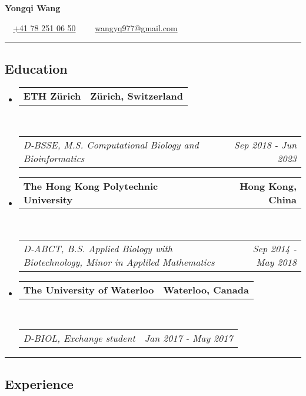 \documentclass[10pt,letterpaper]{article}
\makeatletter
\newcommand{\headerrow}[2]
{\begin{tabular*}{\linewidth}{l@{\extracolsep{\fill}}r}
	#1 &
	#2 \\
\end{tabular*}}
\makeatother
\begin{document}

\begin{center}
{\LARGE \textbf{Yongqi Wang}}

\textbullet \ \ \href{tel:410782510650}{+41 78 251 06 50} \ \
\textbullet \ \ \href{mailto:wangyq977@gmail.com}{wangyq977@gmail.com}
\end{center}



\hrule
\vspace{-1em}
\subsection*{Education}

\begin{itemize}
	\parskip=0.1em

	\item
	\headerrow
		{\textbf{ETH Zürich}}
		{\textbf{Zürich, Switzerland}}
	\\
	\headerrow
		{\emph{D-BSSE, M.S. Computational Biology and Bioinformatics}}
		{\emph{Sep 2018 - Jun 2023}}

	\item
	\headerrow
		{\textbf{The Hong Kong Polytechnic University}}
		{\textbf{Hong Kong, China}}
	\\
	\headerrow
		{\emph{D-ABCT, B.S. Applied Biology with Biotechnology, Minor in Appliled Mathematics}}
		{\emph{Sep 2014 - May 2018}}

	\item
	\headerrow
		{\textbf{The University of Waterloo}}
		{\textbf{Waterloo, Canada}}
	\\
	\headerrow
		{\emph{D-BIOL, Exchange student}}
		{\emph{Jan 2017 - May 2017}}

\end{itemize}



\hrule
\vspace{-1em}
\subsection*{Experience}
\end{document}

